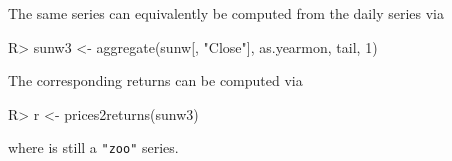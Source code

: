 \documentclass{Z}
\begin{document}
The same series can equivalently be computed from the daily series via
\begin{Schunk}
\begin{Sinput}
R> sunw3 <- aggregate(sunw[, "Close"], as.yearmon, tail, 1)
\end{Sinput}
\end{Schunk}

The corresponding returns can be computed via
\begin{Schunk}
\begin{Sinput}
R> r <- prices2returns(sunw3)
\end{Sinput}
\end{Schunk}
where  is still a \verb/"zoo"/ series.


\end{document}
